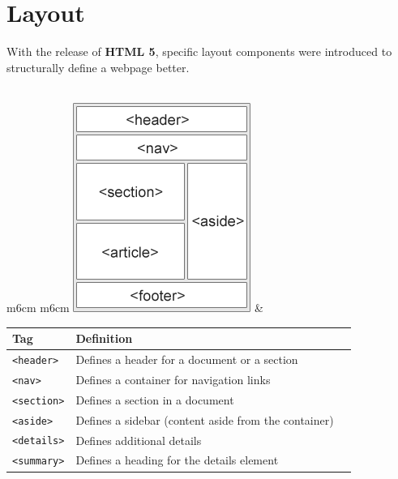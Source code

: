 \documentclass[11pt, letterpaper]{article}
\begin{document}
	\section{Layout}
		With the release of \textbf{HTML 5}, specific layout components were introduced to structurally define a webpage better.\\\\

		\centering
		\begin{tabular}{m{6cm} m{6cm}}
			\includegraphics[scale = 1.3]{layout} & 
			\begin{tabular}{l p{5cm} l}
				\toprule
				Tag & Definition \\\midrule
				\texttt{<header>} & Defines a header for a document or a section \\\midrule
				\texttt{<nav>} & Defines a container for navigation links \\\midrule
				\texttt{<section>} & Defines a section in a document \\\midrule
				\texttt{<aside>} & Defines a sidebar (content aside from the container) \\\midrule
				\texttt{<details>} & Defines additional details \\\midrule
				\texttt{<summary>} & Defines a heading for the details element \\
				\bottomrule
			\end{tabular}
		\end{tabular}
\end{document}
